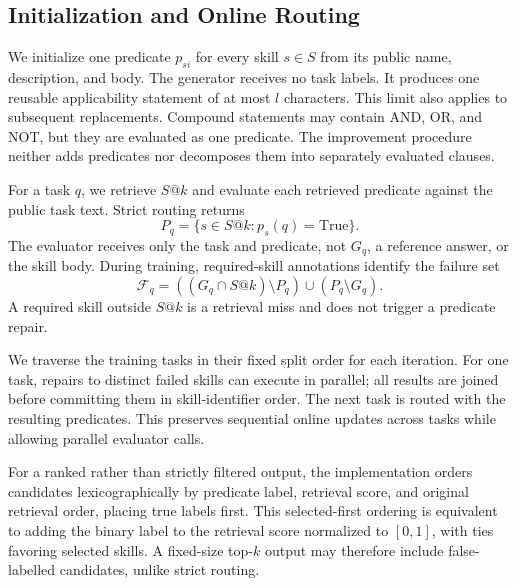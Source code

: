 \subsection{Initialization and Online Routing}
\label{app:procedure-routing}
We initialize one predicate $p_{si}$ for every skill $s\in S$ from its public name, description, and body. The generator receives no task labels. It produces one reusable applicability statement of at most $l$ characters. This limit also applies to subsequent replacements. Compound statements may contain AND, OR, and NOT, but they are evaluated as one predicate. The improvement procedure neither adds predicates nor decomposes them into separately evaluated clauses.

For a task $q$, we retrieve $S@k$ and evaluate each retrieved predicate against the public task text. Strict routing returns
\[
P_q=\{s\in S@k:p_s(q)=\mathrm{True}\}.
\]
The evaluator receives only the task and predicate, not $G_q$, a reference answer, or the skill body. During training, required-skill annotations identify the failure set
\[
\mathcal F_q=((G_q\cap S@k)\setminus P_q)
\cup(P_q\setminus G_q).
\]
A required skill outside $S@k$ is a retrieval miss and does not trigger a predicate repair.

We traverse the training tasks in their fixed split order for each iteration. For one task, repairs to distinct failed skills can execute in parallel; all results are joined before committing them in skill-identifier order. The next task is routed with the resulting predicates. This preserves sequential online updates across tasks while allowing parallel evaluator calls.

For a ranked rather than strictly filtered output, the implementation orders candidates lexicographically by predicate label, retrieval score, and original retrieval order, placing true labels first. This selected-first ordering is equivalent to adding the binary label to the retrieval score normalized to $[0,1]$, with ties favoring selected skills. A fixed-size top-$k$ output may therefore include false-labelled candidates, unlike strict routing.

